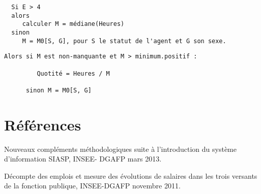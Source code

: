 \documentclass[]{article}
\begin{document}
\begin{verbatim}
  Si E > 4  
  alors 
     calculer M = médiane(Heures) 
  sinon
     M = M0[S, G], pour S le statut de l'agent et G son sexe.   
\end{verbatim}

\begin{verbatim}
Alors si M est non-manquante et M > minimum.positif :  

         Quotité = Heures / M

      sinon M = M0[S, G]   
\end{verbatim}

\section{Références}\label{references}

Nouveaux compléments méthodologiques suite à l'introduction du système
d'information SIASP, INSEE- DGAFP mars 2013.

Décompte des emplois et mesure des évolutions de salaires dans les trois
versants de la fonction publique, INSEE-DGAFP novembre 2011.
\end{document}
